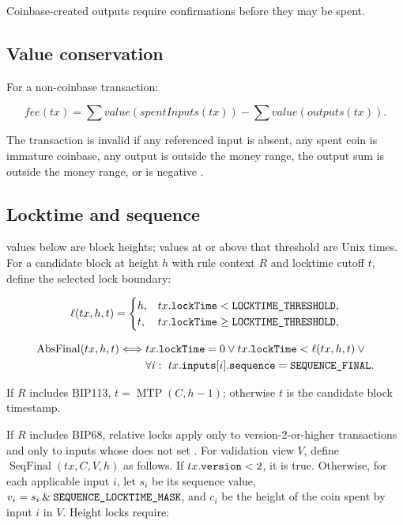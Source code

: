 Coinbase-created outputs require  confirmations before
they may be spent.

\subsection{Value conservation}

For a non-coinbase transaction:

\[
  fee(tx) = \sum value(spentInputs(tx)) - \sum value(outputs(tx)).
\]

The transaction is invalid if any referenced input is absent, any spent coin is
immature coinbase, any output is outside the money range, the output sum is
outside the money range, or  is negative
\cite{bitcoin-core-v31}.

\subsection{Locktime and sequence}

 values below  are block heights;
values at or above that threshold are Unix times. For a candidate block at
height \(h\) with rule context \(R\) and locktime cutoff \(t\), define the
selected lock boundary:

\[
\ell(tx,h,t)=
\begin{cases}
h,
  & tx.\text{\texttt{lockTime}} < \text{\texttt{LOCKTIME\_THRESHOLD}},\\
t,
  & tx.\text{\texttt{lockTime}} \ge \text{\texttt{LOCKTIME\_THRESHOLD}},
\end{cases}
\]

\[
\begin{aligned}
\operatorname{AbsFinal}(tx,h,t) \Longleftrightarrow\;&
tx.\text{\texttt{lockTime}}=0 \vee
tx.\text{\texttt{lockTime}} < \ell(tx,h,t) \vee {}\\
&\forall i:\ tx.\text{\texttt{inputs}}[i].\text{\texttt{sequence}}
  = \text{\texttt{SEQUENCE\_FINAL}}.
\end{aligned}
\]

If \(R\) includes BIP113, \(t=\operatorname{MTP}(C,h-1)\); otherwise \(t\) is
the candidate block timestamp.

If \(R\) includes BIP68, relative locks apply only to version-2-or-higher
transactions and only to inputs whose  does not set
. For validation view \(V\), define
\(\operatorname{SeqFinal}(tx,C,V,h)\) as follows. If
\(tx.\text{\texttt{version}} < 2\), it is true. Otherwise, for each applicable
input \(i\), let \(s_i\) be its sequence value, \(v_i=s_i \mathbin{\&}
\text{\texttt{SEQUENCE\_LOCKTIME\_MASK}}\), and \(c_i\) be the height of
the coin spent by input \(i\) in \(V\). Height locks require:

